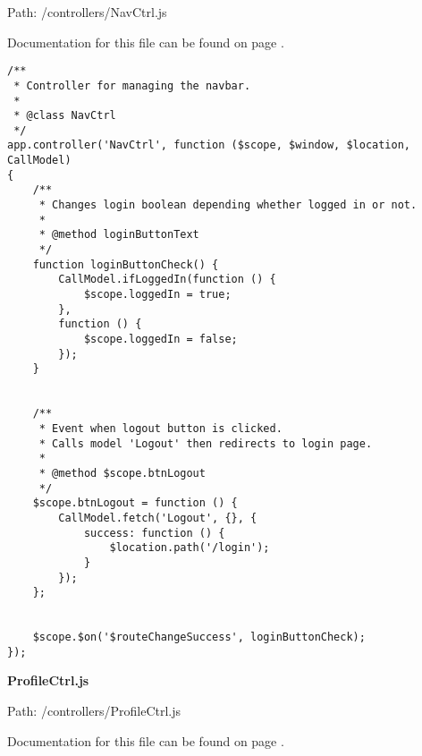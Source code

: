 Path: /controllers/NavCtrl.js

Documentation for this file can be found on page \pageref{NavCtrl.js.doc}.

{\scriptsize
\begin{lstlisting}
/**
 * Controller for managing the navbar.
 *
 * @class NavCtrl
 */
app.controller('NavCtrl', function ($scope, $window, $location, CallModel)
{
	/**
	 * Changes login boolean depending whether logged in or not.
	 *
	 * @method loginButtonText
	 */
	function loginButtonCheck() {
		CallModel.ifLoggedIn(function () {
			$scope.loggedIn = true;
		},
		function () {
			$scope.loggedIn = false;
		});
	}


	/**
	 * Event when logout button is clicked.
	 * Calls model 'Logout' then redirects to login page.
	 *
	 * @method $scope.btnLogout
	 */
	$scope.btnLogout = function () {
		CallModel.fetch('Logout', {}, {
			success: function () {
				$location.path('/login');
			}
		});
	};


	$scope.$on('$routeChangeSuccess', loginButtonCheck);
});\end{lstlisting}
}
\textbf{ProfileCtrl.js}\label{ProfileCtrl.js}

Path: /controllers/ProfileCtrl.js

Documentation for this file can be found on page \pageref{ProfileCtrl.js.doc}.


